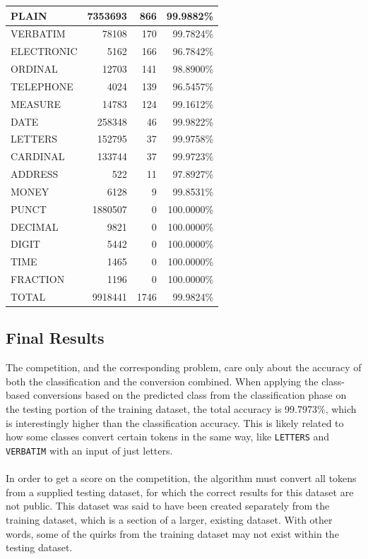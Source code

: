 \documentclass[a4paper, 9pt]{extarticle}
\newcommand{\code}{\texttt}
\begin{document}
\begin{minipage}[t]{0.52\textwidth}
\begin{tabular}{l|r|r|r}
PLAIN       & 7353693 & 866 & 99.9882\%\\ \hline  
VERBATIM    &   78108 & 170 & 99.7824\%\\\hline
ELECTRONIC  &    5162 & 166 & 96.7842\%\\\hline
ORDINAL     &   12703 & 141 & 98.8900\%\\\hline
TELEPHONE   &    4024 & 139 & 96.5457\%\\\hline
MEASURE     &   14783 & 124 & 99.1612\%\\\hline
DATE        &  258348 & 46 & 99.9822\%\\ \hline  
LETTERS     &  152795 & 37 & 99.9758\%\\\hline
CARDINAL    &  133744 & 37 & 99.9723\%\\\hline
ADDRESS     &     522 & 11 & 97.8927\%\\\hline
MONEY       &    6128 & 9 & 99.8531\%\\\hline
PUNCT       & 1880507 & 0 & 100.0000\%\\\hline  
DECIMAL     &    9821 & 0 & 100.0000\%\\\hline
DIGIT       &    5442 & 0 & 100.0000\%\\\hline
TIME        &    1465 & 0 & 100.0000\%\\\hline
FRACTION    &    1196 & 0 & 100.0000\%\\\hline
\hline
TOTAL       & 9918441 & 1746 & 99.9824\%
\end{tabular}
\end{minipage}%
\begin{minipage}[t]{0.48\textwidth}
\subsection{Final Results}
The competition, and the corresponding problem, care only about the accuracy of both the classification and the conversion combined. When applying the class-based conversions based on the predicted class from the classification phase on the testing portion of the training dataset, the total accuracy is 99.7973\%, which is interestingly higher than the classification accuracy. This is likely related to how some classes convert certain tokens in the same way, like \code{LETTERS} and \code{VERBATIM} with an input of just letters.\\
\\
In order to get a score on the competition, the algorithm must convert all tokens from a supplied testing dataset, for which the correct results for this dataset are not public. This dataset was said to have been created separately from the training dataset, which is a section of a larger, existing dataset. With other words, some of the quirks from the training dataset may not exist within the testing dataset.
\end{minipage}\\
\end{document}
